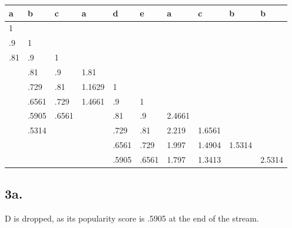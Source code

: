 \documentclass{article}
\begin{document}
\begin{center}
\begin{table}[h]
\begin{tabular}{|l|l|l|l|l|l|l|l|l|l|}
\hline
\textbf{a} & \textbf{b} & \textbf{c} & \textbf{a} & \textbf{d} & \textbf{e} & \textbf{a} & \textbf{c} & \textbf{b} & \textbf{b} \\ \hline
1          &            &            &            &            &            &            &            &            &            \\ \hline
.9         & 1          &            &            &            &            &            &            &            &            \\ \hline
.81        & .9         & 1          &            &            &            &            &            &            &            \\ \hline
           & .81        & .9         & 1.81       &            &            &            &            &            &            \\ \hline
           & .729       & .81        & 1.1629     & 1          &            &            &            &            &            \\ \hline
           & .6561      & .729       & 1.4661     & .9         & 1          &            &            &            &            \\ \hline
           & .5905      & .6561      &            & .81        & .9         & 2.4661     &            &            &            \\ \hline
           & .5314      &            &            & .729       & .81        & 2.219      & 1.6561     &            &            \\ \hline
           &            &            &            & .6561      & .729       & 1.997      & 1.4904     & 1.5314     &            \\ \hline
           &            &            &            & .5905      & .6561      & 1.797      & 1.3413     &            & 2.5314     \\ \hline
\end{tabular}
\end{table}
\end{center}

\subsection{3a.}
\noindent D is dropped, as its popularity score is .5905 at the end of the stream.
\end{document}
